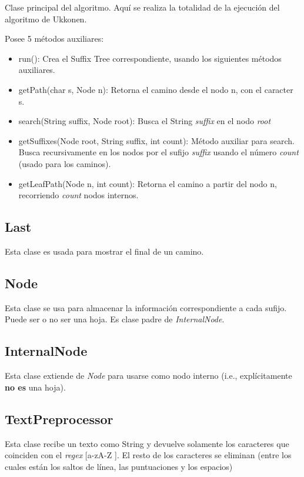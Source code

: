 \documentclass[letterpaper,10pt]{article}
\begin{document}
	Clase principal del algoritmo. Aquí se realiza la totalidad de la ejecución del algoritmo de Ukkonen.

	Posee 5 métodos auxiliares:
	\begin{itemize}
		\item run(): Crea el Suffix Tree correspondiente, usando los siguientes métodos auxiliares.
		\item getPath(char s, Node n): Retorna el camino desde el nodo n, con el caracter s.
		\item search(String suffix, Node root): Busca el String \textit{suffix} en el nodo \textit{root}
		\item getSuffixes(Node root, String suffix, int count): Método auxiliar para search. Busca recursivamente en los nodos por el sufijo \textit{suffix} usando
		el número \textit{count} (usado para los caminos).
		\item getLeafPath(Node n, int count): Retorna el camino a partir del nodo n, recorriendo \textit{count} nodos internos.
	\end{itemize}

	\subsection{Last}

	Esta clase es usada para mostrar el final de un camino.

	\subsection{Node}

	Esta clase se usa para almacenar la información correspondiente a cada sufijo. Puede ser o no ser una hoja. Es clase padre de \textit{InternalNode}.

	\subsection{InternalNode}

	Esta clase extiende de \textit{Node} para usarse como nodo interno (i.e., explícitamente \textbf{no es} una hoja).

	\subsection{TextPreprocessor}

	Esta clase recibe un texto como String y devuelve solamente los caracteres que coinciden con el \textit{regex} [a-zA-Z ]. El resto de los caracteres se eliminan
	(entre los cuales están los saltos de línea, las puntuaciones y los espacios)
\end{document}
